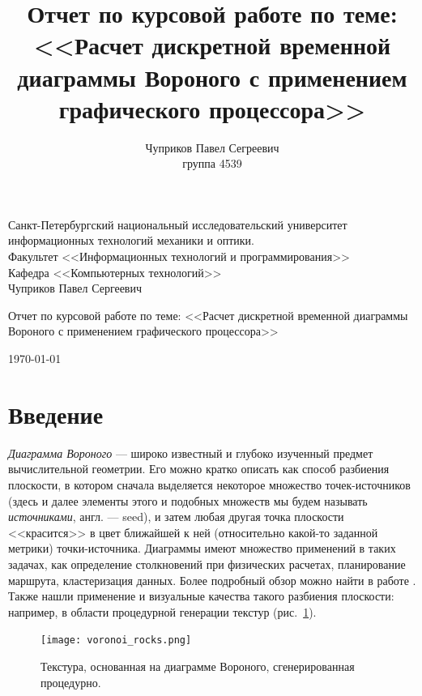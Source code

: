 \documentclass[12pt]{article}
\author{Чуприков Павел Сегреевич \\ группа 4539\\}
\title{Отчет по курсовой работе по теме: <<Расчет дискретной временной диаграммы 
Вороного с применением графического процессора>>}
\begin{document}
\begin{titlepage}
\thispagestyle{empty}
\begin{center}
Санкт-Петербургский 
национальный исследовательский университет информационных технологий
механики и оптики.\\
\bigskip
Факультет <<Информационных технологий и программирования>>\\
Кафедра <<Компьютерных технологий>>\\
\vspace{2cm}
Чуприков Павел Сергеевич\\
\vspace{1cm}
\begin{LARGE}
Отчет по курсовой работе по теме: <<Расчет дискретной временной диаграммы 
Вороного с применением графического процессора>>\\
\end{LARGE}
\vfill
\today
\end{center}
\end{titlepage}
\setcounter{page}{2}
\tableofcontents

\pagebreak

\section{Введение}
\emph{Диаграмма Вороного} --- широко известный и глубоко изученный предмет
вычислительной геометрии. Его можно кратко описать как способ разбиения
плоскости, в котором сначала выделяется некоторое множество точек-источников
(здесь и далее элементы этого и подобных множеств мы будем называть \emph{источниками},
англ. --- seed), и затем любая другая точка плоскости <<красится>> в цвет ближайшей к ней 
(относительно какой-то заданной метрики) точки-источника. 
Диаграммы имеют множество применений в таких
задачах, как определение столкновений при физических расчетах, 
планирование маршрута, кластеризация данных. Более подробный обзор 
можно найти в работе \cite{survey}. Также нашли применение и визуальные качества такого
разбиения плоскости: например, в области процедурной генерации текстур \cite{proced} (рис.~\ref{rocks}). 

\begin{figure}
\begin{center}
\texttt{[image: voronoi\_rocks.png]}
\end{center}
\caption{Текстура, основанная на диаграмме Вороного, сгенерированная процедурно.}
\label{rocks}
\end{figure}
\end{document}
